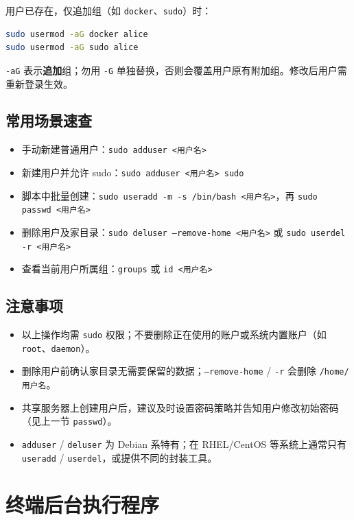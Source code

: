 用户已存在，仅追加组（如 \texttt{docker}、\texttt{sudo}）时：

\begin{lstlisting}[language=sh]
sudo usermod -aG docker alice
sudo usermod -aG sudo alice
\end{lstlisting}

\texttt{-aG} 表示\textbf{追加}组；勿用 \texttt{-G} 单独替换，否则会覆盖用户原有附加组。修改后用户需重新登录生效。

\subsection{常用场景速查}

\begin{itemize}
    \item 手动新建普通用户：\texttt{sudo adduser <用户名>}
    \item 新建用户并允许 sudo：\texttt{sudo adduser <用户名> sudo}
    \item 脚本中批量创建：\texttt{sudo useradd -m -s /bin/bash <用户名>}，再 \texttt{sudo passwd <用户名>}
    \item 删除用户及家目录：\texttt{sudo deluser --remove-home <用户名>} 或 \texttt{sudo userdel -r <用户名>}
    \item 查看当前用户所属组：\texttt{groups} 或 \texttt{id <用户名>}
\end{itemize}

\subsection{注意事项}

\begin{itemize}
    \item 以上操作均需 \texttt{sudo} 权限；不要删除正在使用的账户或系统内置账户（如 \texttt{root}、\texttt{daemon}）。
    \item 删除用户前确认家目录无需要保留的数据；\texttt{--remove-home} / \texttt{-r} 会删除 \texttt{/home/用户名}。
    \item 共享服务器上创建用户后，建议及时设置密码策略并告知用户修改初始密码（见上一节 \texttt{passwd}）。
    \item \texttt{adduser} / \texttt{deluser} 为 Debian 系特有；在 RHEL/CentOS 等系统上通常只有 \texttt{useradd} / \texttt{userdel}，或提供不同的封装工具。
\end{itemize}

\section{终端后台执行程序}

